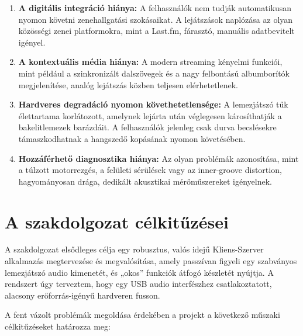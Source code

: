 \documentclass[12pt,a4paper,hungarian]{report}
\begin{document}
\begin{enumerate}
    \item \textbf{A digitális integráció hiánya:} A felhasználók nem tudják automatikusan nyomon követni zenehallgatási szokásaikat. A lejátszások naplózása az olyan közösségi zenei platformokra, mint a Last.fm, fárasztó, manuális adatbevitelt igényel.
    \item \textbf{A kontextuális média hiánya:} A modern streaming kényelmi funkciói, mint például a szinkronizált dalszövegek és a nagy felbontású albumborítók megjelenítése, analóg lejátszás közben teljesen elérhetetlenek.
    \item \textbf{Hardveres degradáció nyomon követhetetlensége:} A lemezjátszó tűk élettartama korlátozott, amelynek lejárta után véglegesen károsíthatják a bakelitlemezek barázdáit. A felhasználók jelenleg csak durva becslésekre támaszkodhatnak a hangszedő kopásának nyomon követésében.
    \item \textbf{Hozzáférhető diagnosztika hiánya:} Az olyan problémák azonosítása, mint a túlzott motorrezgés, a felületi sérülések vagy az inner-groove distortion, hagyományosan drága, dedikált akusztikai mérőműszereket igényelnek.
\end{enumerate}

\section{A szakdolgozat célkitűzései}

A szakdolgozat elsődleges célja egy robusztus, valós idejű Kliens-Szerver alkalmazás megtervezése és megvalósítása, amely passzívan figyeli egy szabványos lemezjátszó audio kimenetét, és „okos” funkciók átfogó készletét nyújtja. A rendszert úgy terveztem, hogy egy USB audio interfészhez csatlakoztatott, alacsony erőforrás-igényű hardveren fusson.

A fent vázolt problémák megoldása érdekében a projekt a következő műszaki célkitűzéseket határozza meg:
\end{document}
